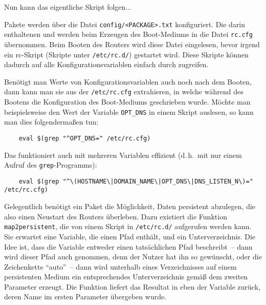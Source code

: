     Nun kann das eigentliche Skript folgen...




    Pakete werden über die Datei \texttt{config/<PACKAGE>.txt}
    konfiguriert. Die darin enthaltenen und
     werden beim Erzeugen
    des Boot-Mediums in die Datei \texttt{rc.cfg} übernommen. Beim Booten des
    Routers wird diese Datei eingelesen, bevor irgend ein rc-Skript
    (Skripte unter \texttt{/etc/rc.d/}) gestartet wird. Diese Skripte können
    dadurch auf alle Konfigurationsvariablen einfach durch
     zugreifen.

    Benötigt man Werte von Konfigurationsvariablen auch noch nach dem
    Booten, dann kann man sie aus der \texttt{/etc/rc.cfg} extrahieren, in
    welche während des Bootens die Konfiguration des Boot-Mediums geschrieben
    wurde. Möchte man beispielsweise den Wert der Variable \texttt{OPT\_DNS}
    in einem Skript auslesen, so kann man dies folgendermaßen tun:

\begin{example}
\begin{verbatim}
    eval $(grep "^OPT_DNS=" /etc/rc.cfg)
\end{verbatim}
\end{example}

    Das funktioniert auch mit mehreren Variablen effizient (d.\,h.\ mit nur
    einem Aufruf des \texttt{grep}-Programms):

\begin{example}
\begin{verbatim}
    eval $(grep "^\(HOSTNAME\|DOMAIN_NAME\|OPT_DNS\|DNS_LISTEN_N\)=" /etc/rc.cfg)
\end{verbatim}
\end{example}


Gelegentlich benötigt ein Paket die Möglichkeit, Daten persistent abzulegen,
die also einen Neustart des Routers überleben. Dazu existiert die Funktion
\texttt{map2persistent}, die von einem Skript in \texttt{/etc/rc.d/}
aufgerufen werden kann. Sie erwartet eine Variable, die einen Pfad enthält,
und ein Unterverzeichnis. Die Idee ist, dass die Variable entweder einen
tatsächlichen Pfad beschreibt~-- dann wird dieser Pfad auch genommen, denn der
Nutzer hat ihn so gewünscht, oder die Zeichenkette "`auto"'~-- dann wird
unterhalb eines Verzeichnisses auf einem persistenten Medium ein entsprechendes
Unterverzeichnis gemäß dem zweiten Parameter erzeugt. Die Funktion liefert
das Resultat in eben der Variable zurück, deren Name im ersten Parameter
übergeben wurde.

